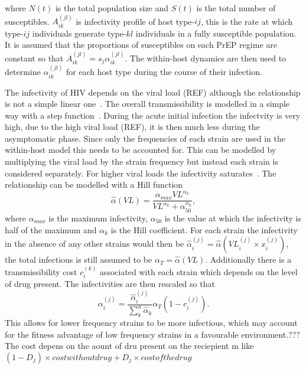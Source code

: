 \documentclass[DIV=15]{scrartcl}
\begin{document}
where $N(t)$ is the total population size and $S(t)$ is the total number of susceptibles. $A_{ik}^{(jl)}$ is infectivity   profile  of  host type-$ij$, this is the rate at which  type-$ij$ individuals generate  type-$kl$ individuals in a fully susceptible population. It is assumed that the proportions of susceptibles on each PrEP regime are constant so that  $A_{ik}^{(jl)} 
= s_j \alpha_{ik}^{(jl)} $. The within-host dynamics are then used to determine $\alpha_{ik}^{(jl)} $ for each host type during the course of their infection.

 The infectivity of HIV depends on the viral load (REF) although the relationship is not a simple  linear one~\cite{fraser2007}. The overall transmissibility is  modelled  in a simple way with a step function~\cite{hollingsworth2008}. During the acute initial infection the infectvity is very high, due to the high viral load (REF), it is then much less during the asymptomatic phase. Since only the  frequencies of each strain are used in the within-host model this needs to be accounted for. This can be modelled by multiplying the viral load by the strain frequency but instead each strain is considered separately. For higher viral loads the infectivity saturates~\cite{fraser2007}.  The relationship can be modelled with a Hill function~\cite{shirreff2011} 
\begin{equation*}
\hat{\alpha}(VL) = \frac{\alpha_{max}VL^{\alpha_k}}{VL^{\alpha_k} + \alpha_{50}^{\alpha_k}},
\end{equation*}
where $ \alpha_{max}$ is the maximum infectivity, $\alpha_{50}$ is the value at which the infectivity is half of the maximum and $\alpha_k$ is the Hill coefficient.
For each strain the infectivity in the absence of any other strains would then be 
$\hat{\alpha}_i^{(j)} =  \hat{\alpha}(VL_i^{(j)} \times x_i^{(j)})$, the total infectious is still assumed to be $\alpha_T = \hat{\alpha}(VL)$.  Additionally there is a transmissibility  cost $c_i^{(k)}$ associated with each strain which depends on the level  of  drug present. The infectivities are then rescaled so  that 
\begin{equation*}
\alpha_{i}^{(j)} = \frac{\hat{\alpha}_i^{(j)}}{\sum_k^n\hat{\alpha}_k }\alpha_T(1-c_{i}^{(j)}).
\end{equation*}
This allows for lower frequency strains to be more infectious, which may account for the  fitness advantage of low frequency strains in a favourable environment.???
The cost depens on the aount of  dru  present  on the  reciepient m
like $(1-D_j) \times cost without drug + D_j \times cost of  the drug $
  
\end{document}
